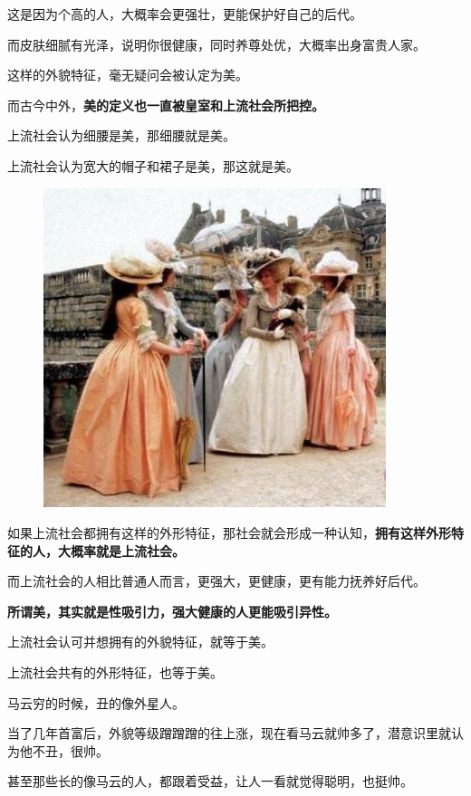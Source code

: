 \documentclass[UTF8, 11pt, oneside]{ctexart}
\newcommand{\zd}[1]{\textbf{\textcolor[RGB]{123,12,0}{#1}}} %
\begin{document}
这是因为个高的人，大概率会更强壮，更能保护好自己的后代。

而皮肤细腻有光泽，说明你很健康，同时养尊处优，大概率出身富贵人家。

这样的外貌特征，毫无疑问会被认定为美。

而古今中外，\zd{美的定义也一直被皇室和上流社会所把控。}

上流社会认为细腰是美，那细腰就是美。

上流社会认为宽大的帽子和裙子是美，那这就是美。

\begin{figure}[H]
    \centering
    \includegraphics[width=10cm]{2023-09-06-001}
\end{figure}

如果上流社会都拥有这样的外形特征，那社会就会形成一种认知，\zd{拥有这样外形特征的人，大概率就是上流社会。}

而上流社会的人相比普通人而言，更强大，更健康，更有能力抚养好后代。

\zd{所谓美，其实就是性吸引力，强大健康的人更能吸引异性。}

上流社会认可并想拥有的外貌特征，就等于美。

上流社会共有的外形特征，也等于美。

马云穷的时候，丑的像外星人。

当了几年首富后，外貌等级蹭蹭蹭的往上涨，现在看马云就帅多了，潜意识里就认为他不丑，很帅。

甚至那些长的像马云的人，都跟着受益，让人一看就觉得聪明，也挺帅。
\end{document}
